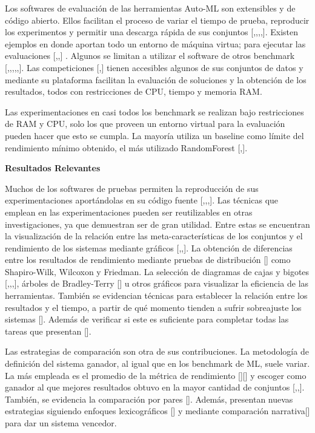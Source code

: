Los softwares de evaluación de las herramientas Auto-ML son extensibles y de código abierto. Ellos facilitan el proceso de variar el tiempo de 
prueba, reproducir los experimentos y permitir una descarga rápida de sus conjuntos [\cite{10},\cite{15},\cite{23},\cite{28},\cite{31}].
Existen ejemplos en donde aportan todo un entorno de máquina virtua; para ejecutar las evaluaciones [\cite{10},\cite{15},\cite{31}] . Algunos se limitan a 
utilizar el software de otros benchmark [\cite{17},\cite{19},\cite{20},\cite{21},\cite{26},\cite{32}]. Las 
competiciones [\cite{11},\cite{29}] tienen accesibles algunos de sus conjuntos de datos y mediante su plataforma facilitan la evaluación de soluciones y la 
obtención de los resultados, todos con restricciones de CPU, tiempo y memoria RAM.

Las experimentaciones en casi todos los benchmark se realizan bajo restricciones de RAM y CPU, solo los que proveen un entorno virtual para la evaluación 
pueden hacer que esto se cumpla. La mayoría utiliza un baseline como límite del rendimiento mínimo obtenido, el más utilizado RandomForest [\cite{29},\cite{31}].

\begin{flushleft} 
    {\large { \textbf{Resultados Relevantes}}}\label{subsection:result Auto-ML}
\end{flushleft}

Muchos de los softwares de pruebas permiten la reproducción de sus experimentaciones aportándolas en su código fuente [\cite{10},\cite{15},\cite{23},\cite{31}]. 
Las técnicas que emplean en las experimentaciones pueden ser reutilizables en otras investigaciones, ya que demuestran ser de gran utilidad. Entre estas se 
encuentran la visualización de la relación entre las meta-características de los conjuntos y el rendimiento de los sistemas mediante gráficos [\cite{10},\cite{26},\cite{30}]. 
La obtención de diferencias entre los resultados de rendimiento mediante pruebas de distribución [\cite{18}] como Shapiro-Wilk, Wilcoxon y Friedman. La selección de 
diagramas de cajas y bigotes [\cite{10},\cite{16},\cite{22},\cite{31}], árboles de Bradley-Terry [\cite{31}] u otros gráficos para visualizar la eficiencia de las 
herramientas. También se evidencian técnicas para establecer la relación entre los resultados y el tiempo, a partir de qué momento tienden a sufrir sobreajuste los 
sistemas [\cite{15}]. Además de verificar si este es suficiente para completar todas las tareas que presentan [\cite{29}].

Las estrategias de comparación son otra de sus contribuciones. La metodología de definición del sistema ganador, al igual que en los benchmark de ML, suele variar. 
La más empleada es el promedio de la métrica de rendimiento [\cite{15}][\cite{31}] y escoger como ganador al que mejores resultados obtuvo en la mayor cantidad de 
conjuntos [\cite{18},\cite{10},\cite{9}]. También, se evidencia la comparación por pares [\cite{10}]. Además, presentan nuevas estrategias siguiendo enfoques 
lexicográficos [\cite{25}] y mediante comparación narrativa[\cite{14}] para dar un sistema vencedor.

